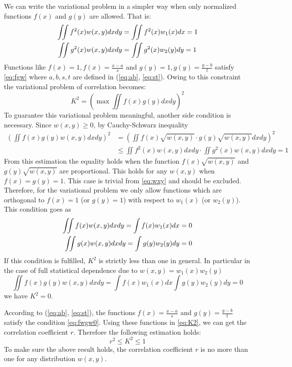 \documentclass{article}
\begin{document}
We can write the variational problem in a simpler way when 
only normalized functions $f(x)$ and $g(y)$ are allowed.
That is:
\begin{align}
\iint f^2(x) w(x,y)dxdy &= \iint f^2(x)w_1(x)dx=1\notag\\
\iint g^2(x) w(x,y)dxdy &= \iint g^2(x)w_2(y)dy=1 \label{eq:fgw}
\end{align}
Functions like $f(x)=1, f(x)=\frac{x-a}{s}$
and $g(y)=1, g(y)=\frac{y-b}{t}$ satisfy \eqref{eq:fgw}
where $a,b,s,t$ are defined in (\ref{eq:ab}, \ref{eq:st}).
Owing to this constraint the variational problem of correlation becomes:
\begin{equation}\label{eq:K2}
    K^2 = (\max \iint f(x)g(y)dxdy)^2
\end{equation}
To guarantee this variational problem meaningful, another
side condition is necessary. Since $w(x,y)\geq 0$, by
Cauchy-Schwarz inequality
\begin{align*}
    (\iint f(x)g(y)w(x,y)dxdy)^2
    &= (\iint f(x)\sqrt{w(x,y)} \cdot g(y)\sqrt{w(x,y)}dxdy)^2\\
    &\le \iint f^2(x)w(x,y)dxdy\cdot 
    \iint g^2(x)w(x,y)dxdy = 1
\end{align*}
From this estimation the equality holds when the function
$f(x)\sqrt{w(x,y)}$ and $g(y)\sqrt{w(x,y)}$ are proportional.
This holds for any $w(x,y)$ when $f(x)=g(y)=1$. This case is trivial from \eqref{eq:wxy} and should be excluded. Therefore, for the variational problem we only allow
functions which are orthogonal to $f(x)=1$ (or $g(y)=1$)
with respect to $w_1(x)$ (or $w_2(y)$). This condition goes
as
\begin{align}
    \iint f(x)w(x,y)dxdy = \int f(x)w_1(x)dx=0 \notag\\
        \iint g(x)w(x,y)dxdy = \int g(y)w_2(y)dy=0
        \label{eq:fwgw0}
\end{align}
If this condition is fulfilled, $K^2$ is strictly less than
one in general. In particular in the case of full
statistical dependence due to $w(x,y)=w_1(x)w_2(y)$
$$
\iint f(x)g(y) w(x,y) dxdy=
\int f(x)w_1(x)dx \int g(y) w_2(y) dy = 0
$$
we have $K^2=0$.

According to (\ref{eq:ab}, \ref{eq:st}), the functions
$f(x) = \frac{x-a}{s}$
and $g(y) = \frac{y-b}{t}$
satisfy the condition \eqref{eq:fwgw0}.
Using these functions in \eqref{eq:K2},
we can get the correlation coefficient $r$. Therefore the
following estimation holds:
\begin{equation}
    r^2 \leq K^2 \leq 1
\end{equation}
To make sure the above result holds, the correlation
coefficient $r$ is no more than one for any distribution
$w(x,y)$.
\end{document}

